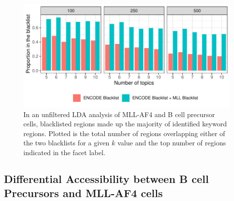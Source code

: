 \begin{figure}
    \centering
    \includegraphics[width=\textwidth]{plot/ch5/mll_bl_olap.pdf}
    \caption{In an unfiltered LDA analysis of MLL-AF4 and B cell precursor cells, blacklisted regions made up the majority of identified keyword regions. Plotted is the total number of regions overlapping either of the two blacklists for a given $k$ value and the top number of regions indicated in the facet label. }
    \label{fig:mll_bl_olap}
\end{figure}

\subsection{Differential Accessibility between B cell Precursors and MLL-AF4 cells} \label{ch5:mll_diffacc}

